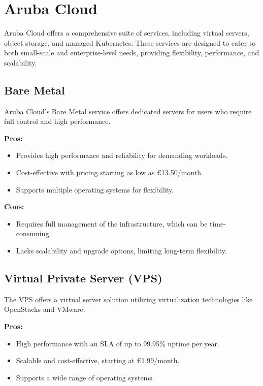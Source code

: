 \section{Aruba Cloud}
\label{aruba-cloud}

Aruba Cloud offers a comprehensive suite of services, including virtual servers, object storage, and managed Kubernetes\cite{site:kubernetes}. These services are designed to cater to both small-scale and enterprise-level needs, providing flexibility, performance, and scalability.

\subsection*{Bare Metal}
Aruba Cloud's Bare Metal service offers dedicated servers for users who require full control and high performance.

\textbf{Pros:}
\begin{itemize}
    \item Provides high performance and reliability for demanding workloads.
    \item Cost-effective with pricing starting as low as €13.50/month.
    \item Supports multiple operating systems for flexibility.
\end{itemize}

\textbf{Cons:}
\begin{itemize}
    \item Requires full management of the infrastructure, which can be time-consuming.
    \item Lacks scalability and upgrade options, limiting long-term flexibility.
\end{itemize}

\subsection*{Virtual Private Server (VPS)}
The VPS offers a virtual server solution utilizing virtualization technologies like OpenStacks and VMware.

\textbf{Pros:}
\begin{itemize}
    \item High performance with an SLA of up to 99.95\% uptime per year.
    \item Scalable and cost-effective, starting at €1.99/month.
    \item Supports a wide range of operating systems.
\end{itemize}

